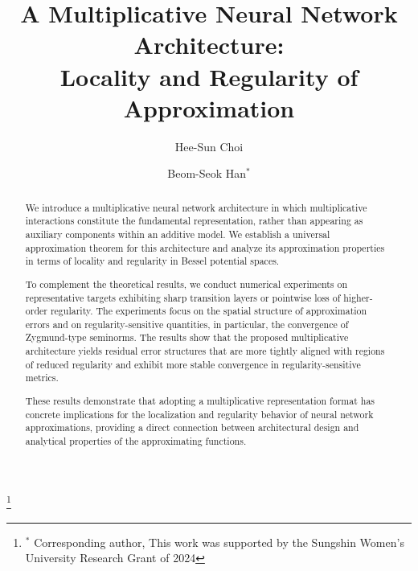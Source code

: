\documentclass[11pt,reqno]{amsart}
\numberwithin{equation}{section}
\theoremstyle{remark}
\theoremstyle{definition}
\begin{document}
\title[]
{A Multiplicative Neural Network Architecture:\\
Locality and Regularity of Approximation
}

\author{Hee-Sun Choi}
\address{Department of Artificial Intelligence and Robotics, 
Sejong University, 
Seoul, Republic of Korea}


\author{Beom-Seok Han$^*$}
\address{Department of Mathematics,
Sungshin Women’s University,
Seoul, Republic of Korea}
\thanks{$^*$ Corresponding author, This work was supported by the Sungshin Women’s University Research Grant of 2024}

\subjclass[2020]{}



\begin{abstract}
We introduce a multiplicative neural network architecture in which multiplicative interactions constitute the fundamental representation, rather than appearing as auxiliary components within an additive model.
We establish a universal approximation theorem for this architecture and analyze its approximation properties in terms of locality and regularity in Bessel potential spaces.

To complement the theoretical results, we conduct numerical experiments on representative targets exhibiting sharp transition layers or pointwise loss of higher-order regularity.
The experiments focus on the spatial structure of approximation errors and on regularity-sensitive quantities, in particular, the convergence of Zygmund-type seminorms.
The results show that the proposed multiplicative architecture yields residual error structures that are more tightly aligned with regions of reduced regularity and exhibit more stable convergence in regularity-sensitive metrics.

These results demonstrate that adopting a multiplicative representation format has concrete implications for the localization and regularity behavior of neural network approximations, providing a direct connection between architectural design and analytical properties of the approximating functions.
\end{abstract}
\end{document}
